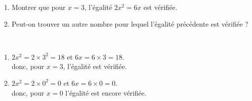 \begin{exercice*} %
   \begin{enumerate}
      \item Montrer que pour $x =3$, l'égalité $2x^2 =6x$ est vérifiée.
      \item Peut-on trouver un autre nombre pour lequel l'égalité précédente est vérifiée ?
   \end{enumerate}
\end{exercice*}

\begin{corrige}
   \ \\ [-5mm]
   \begin{enumerate}
      \item $2x^2 =2\times3^2 =18$ et $6x =6\times3 =18$. \\
      donc, pour $x =3$, {\red l'égalité est vérifiée}.
      \item $2x^2 =2\times0^2 =0$ et $6x =6\times0 =0$. \\
      donc, {\red pour $x =0$} l'égalité est encore vérifiée.
   \end{enumerate}
\end{corrige}
